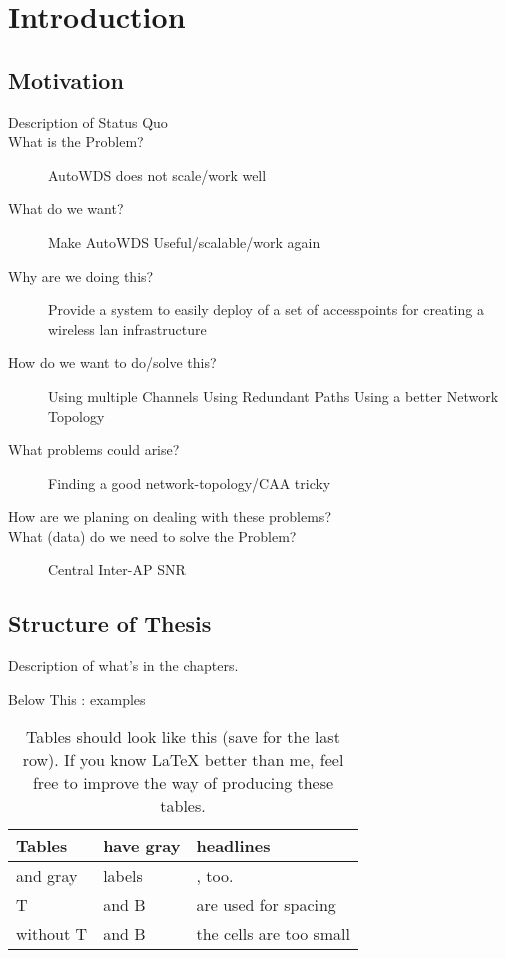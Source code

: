 \chapter{Introduction}
\section{Motivation}
\begin{description}
\item[Description of Status Quo]
\item[What is the Problem?]
AutoWDS does not scale/work well
\item[What do we want?]
Make AutoWDS Useful/scalable/work again
\item[Why are we doing this?]
Provide a system to easily deploy of a set of accesspoints for creating a wireless lan infrastructure
\item[How do we want to do/solve this?]
Using multiple Channels
Using Redundant Paths Using a better Network Topology
\item[What problems could arise?]
Finding a good network-topology/CAA tricky
\item[How are we planing on dealing with these problems?]
\item[What (data) do we need to solve the Problem?]
Central Inter-AP SNR
\end{description}

\section{Structure of Thesis}
Description of what's in the chapters.

Below This : examples

\begin{table}[b]
\caption{Tables should look like this (save for the last row). If you know LaTeX better than me, feel free to improve the way of producing these tables.}
\begin{tabularx}{\linewidth}{|l|X|X|}
\hline
\rowcolor{slightgray}
\T Tables	&have gray  &headlines\\
\hline
\cellcolor{slightgray}\T and gray &labels \B&, too.\\
\hline
\cellcolor{slightgray}\T T &and B& are used for spacing\B\\
\hline
\cellcolor{slightgray} without T & and B& the cells are too small\B\\
\hline 
\end{tabularx}
\label{tab:example}
\end{table}


